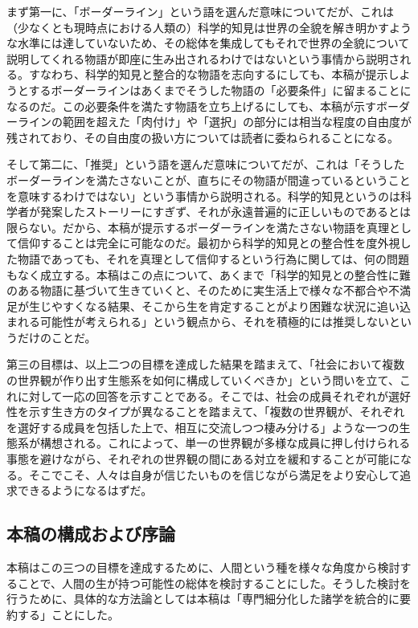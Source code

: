 まず第一に、「ボーダーライン」という語を選んだ意味についてだが、これは（少なくとも現時点における人類の）科学的知見は世界の全貌を解き明かすような水準には達していないため、その総体を集成してもそれで世界の全貌について説明してくれる物語が即座に生み出されるわけではないという事情から説明される。すなわち、科学的知見と整合的な物語を志向するにしても、本稿が提示しようとするボーダーラインはあくまでそうした物語の「必要条件」に留まることになるのだ。この必要条件を満たす物語を立ち上げるにしても、本稿が示すボーダーラインの範囲を超えた「肉付け」や「選択」の部分には相当な程度の自由度が残されており、その自由度の扱い方については読者に委ねられることになる。

そして第二に、「推奨」という語を選んだ意味についてだが、これは「そうしたボーダーラインを満たさないことが、直ちにその物語が間違っているということを意味するわけではない」という事情から説明される。科学的知見というのは科学者が発案したストーリーにすぎず、それが永遠普遍的に正しいものであるとは限らない。だから、本稿が提示するボーダーラインを満たさない物語を真理として信仰することは完全に可能なのだ。最初から科学的知見との整合性を度外視した物語であっても、それを真理として信仰するという行為に関しては、何の問題もなく成立する。本稿はこの点について、あくまで「科学的知見との整合性に難のある物語に基づいて生きていくと、そのために実生活上で様々な不都合や不満足が生じやすくなる結果、そこから生を肯定することがより困難な状況に追い込まれる可能性が考えられる」という観点から、それを積極的には推奨しないというだけのことだ。

第三の目標は、以上二つの目標を達成した結果を踏まえて、「社会において複数の世界観が作り出す生態系を如何に構成していくべきか」という問いを立て、これに対して一応の回答を示すことである。そこでは、社会の成員それぞれが選好性を示す生き方のタイプが異なることを踏まえて、「複数の世界観が、それぞれを選好する成員を包括した上で、相互に交流しつつ棲み分ける」ような一つの生態系が構想される。これによって、単一の世界観が多様な成員に押し付けられる事態を避けながら、それぞれの世界観の間にある対立を緩和することが可能になる。そこでこそ、人々は自身が信じたいものを信じながら満足をより安心して追求できるようになるはずだ。

\subsection{本稿の構成および序論}\label{ux672cux7a3fux306eux69cbux6210ux304aux3088ux3073ux5e8fux8ad6}

本稿はこの三つの目標を達成するために、人間という種を様々な角度から検討することで、人間の生が持つ可能性の総体を検討することにした。そうした検討を行うために、具体的な方法論としては本稿は「専門細分化した諸学を統合的に要約する」ことにした。

